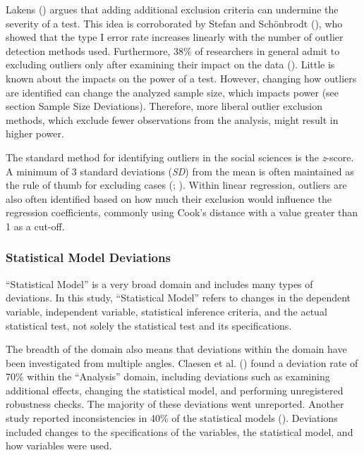 \documentclass[
  man,
  floatsintext,
  longtable,
  nolmodern,
  notxfonts,
  notimes,
  colorlinks=true,linkcolor=blue,citecolor=blue,urlcolor=blue]{apa7}
\begin{document}
Lakens () argues that adding additional
exclusion criteria can undermine the severity of a test. This idea is
corroborated by Stefan and Schönbrodt (),
who showed that the type I error rate increases linearly with the number
of outlier detection methods used. Furthermore, 38\% of researchers in
general admit to excluding outliers only after examining their impact on
the data (). Little is known
about the impacts on the power of a test. However, changing how outliers
are identified can change the analyzed sample size, which impacts power
(see section Sample Size Deviations). Therefore, more liberal outlier
exclusion methods, which exclude fewer observations from the analysis,
might result in higher power.

The standard method for identifying outliers in the social sciences is
the \emph{z}-score. A minimum of 3 standard deviations (\emph{SD}) from
the mean is often maintained as the rule of thumb for excluding cases
(;
). Within linear regression,
outliers are also often identified based on how much their exclusion
would influence the regression coefficients, commonly using Cook's
distance with a value greater than 1 as a cut-off.

\subsubsection{Statistical Model
Deviations}\label{statistical-model-deviations}

``Statistical Model'' is a very broad domain and includes many types of
deviations. In this study, ``Statistical Model'' refers to changes in
the dependent variable, independent variable, statistical inference
criteria, and the actual statistical test, not solely the statistical
test and its specifications.

The breadth of the domain also means that deviations within the domain
have been investigated from multiple angles. Claesen et al.
() found a deviation rate of 70\% within
the ``Analysis'' domain, including deviations such as examining
additional effects, changing the statistical model, and performing
unregistered robustness checks. The majority of these deviations went
unreported. Another study reported inconsistencies in 40\% of the
statistical models (). Deviations included changes to the
specifications of the variables, the statistical model, and how
variables were used.
\end{document}

